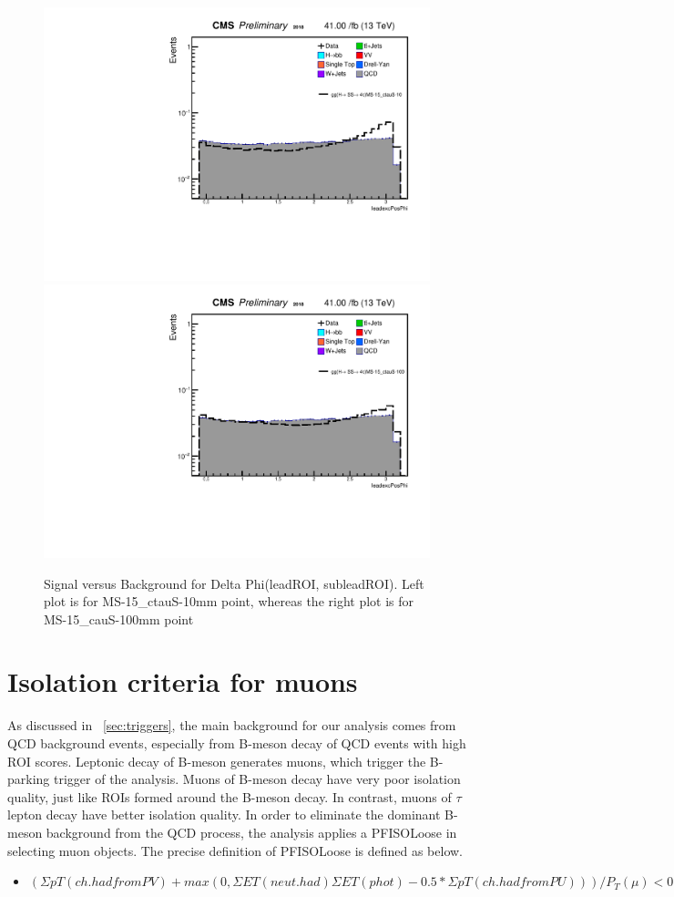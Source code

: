  \begin{figure}[h!]
   \caption{Signal versus Background for Delta Phi(leadROI, subleadROI). Left plot is for MS-15\_ctauS-10mm point, whereas the right plot is for MS-15\_cauS-100mm point}
   \label{fig:leadexcPosPhi}
   \centering
   \includegraphics[width=0.47\linewidth]{figs/AnalysisNoteplot_MS-15_ctauS-10_leadexcPosPhi.pdf}
   \includegraphics[width=0.47\linewidth]{figs/AnalysisNoteplot_MS-15_ctauS-100_leadexcPosPhi.pdf}
 \end{figure}

\section{Isolation criteria for muons}\label{ref:muISO}
As discussed in ~\ref{sec:triggers}, the main background for our analysis comes from QCD background events, especially from B-meson decay of QCD events with high ROI scores. 
Leptonic decay of B-meson generates muons, which trigger the B-parking trigger of the analysis.
Muons of B-meson decay have very poor isolation quality, just like ROIs formed around the B-meson decay.
In contrast, muons of $\tau$ lepton decay have better isolation quality.
In order to eliminate the dominant B-meson background from the QCD process, the analysis applies a PFISOLoose in selecting muon objects.
The precise definition of PFISOLoose is defined as below.
\begin{itemize}
  \item $(\Sigma pT(ch.had from PV)+max(0,\Sigma ET(neut.had) \Sigma ET (phot)-0.5* \Sigma pT(ch.had from PU)))/P_{T}(\mu)<0.25$
\end{itemize}

